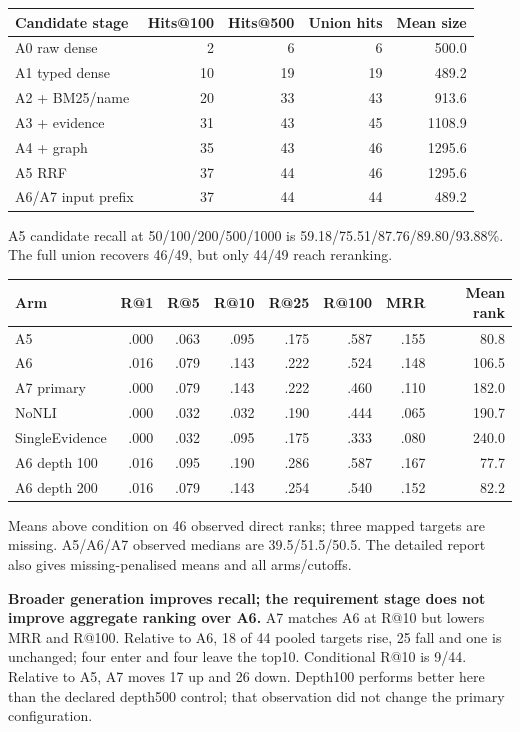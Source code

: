 \documentclass[11pt,a4paper]{article}
\begin{document}
\begin{center}\small
\begin{tabular}{@{}lrrrr@{}}
\toprule
Candidate stage & Hits@100 & Hits@500 & Union hits & Mean size\\
\midrule
A0 raw dense & 2 & 6 & 6 & 500.0\\
A1 typed dense & 10 & 19 & 19 & 489.2\\
A2 + BM25/name & 20 & 33 & 43 & 913.6\\
A3 + evidence & 31 & 43 & 45 & 1108.9\\
A4 + graph & 35 & 43 & 46 & 1295.6\\
A5 RRF & 37 & 44 & 46 & 1295.6\\
A6/A7 input prefix & 37 & 44 & 44 & 489.2\\
\bottomrule
\end{tabular}
\end{center}
A5 candidate recall at 50/100/200/500/1000 is 59.18/75.51/87.76/89.80/93.88\%. The full union recovers 46/49, but only 44/49 reach reranking.

\begin{center}\small
\begin{tabular}{@{}lrrrrrrr@{}}
\toprule
Arm & R@1 & R@5 & R@10 & R@25 & R@100 & MRR & Mean rank\\
\midrule
A5 & .000 & .063 & .095 & .175 & .587 & .155 & 80.8\\
A6 & .016 & .079 & .143 & .222 & .524 & .148 & 106.5\\
A7 primary & .000 & .079 & .143 & .222 & .460 & .110 & 182.0\\
NoNLI & .000 & .032 & .032 & .190 & .444 & .065 & 190.7\\
SingleEvidence & .000 & .032 & .095 & .175 & .333 & .080 & 240.0\\
A6 depth 100 & .016 & .095 & .190 & .286 & .587 & .167 & 77.7\\
A6 depth 200 & .016 & .079 & .143 & .254 & .540 & .152 & 82.2\\
\bottomrule
\end{tabular}
\end{center}
Means above condition on 46 observed direct ranks; three mapped targets are missing. A5/A6/A7 observed medians are 39.5/51.5/50.5. The detailed report also gives missing-penalised means and all arms/cutoffs.

\textbf{Broader generation improves recall; the requirement stage does not improve aggregate ranking over A6.} A7 matches A6 at R@10 but lowers MRR and R@100. Relative to A6, 18 of 44 pooled targets rise, 25 fall and one is unchanged; four enter and four leave the top10. Conditional R@10 is 9/44. Relative to A5, A7 moves 17 up and 26 down. Depth100 performs better here than the declared depth500 control; that observation did not change the primary configuration.
\end{document}
